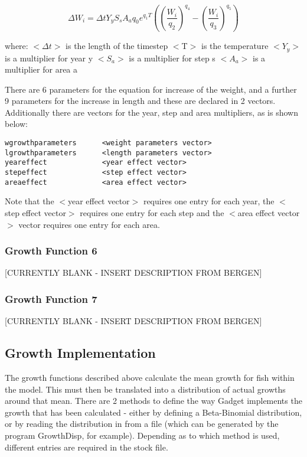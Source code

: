 \documentclass [a4paper, 10pt]{book}
\begin{document}
\begin{equation}\label{eq:growth5w}
\Delta W_i = \Delta t Y_y S_s A_a q_0 e^{q_1T}\left( 
\left( \frac{W_i}{q_2} \right)^{q_4} -
\left( \frac{W_i}{q_3} \right)^{q_5} \right)
\end{equation}

where:\newline
$<$$\Delta t$$>$ is the length of the timestep\newline
$<$T$>$ is the temperature\newline
$<$$Y_y$$>$ is a multiplier for year y\newline 
$<$$S_a$$>$ is a multiplier for step s\newline 
$<$$A_a$$>$ is a multiplier for area a 

\bigskip
There are 6 parameters for the equation for increase of the weight, and a further 9 parameters for the increase in length and these are declared in 2 vectors.  Additionally there are vectors for the year, step and area multipliers, as is shown below:

\begin{verbatim}
wgrowthparameters      <weight parameters vector>
lgrowthparameters      <length parameters vector>
yeareffect             <year effect vector>
stepeffect             <step effect vector>
areaeffect             <area effect vector>
\end{verbatim}

Note that the $<$year effect vector$>$ requires one entry for each year, the $<$step effect vector$>$ requires one entry for each step and the $<$area effect vector$>$ vector requires one entry for each area.

\subsubsection{Growth Function 6}\label{subsec:growth6}
[CURRENTLY BLANK - INSERT DESCRIPTION FROM BERGEN]

\subsubsection{Growth Function 7}\label{subsec:growth7}
[CURRENTLY BLANK - INSERT DESCRIPTION FROM BERGEN]

\subsection{Growth Implementation}\label{subsec:stockgrowthimplement}
The growth functions described above calculate the mean growth for fish within the model. This must then be translated into a distribution of actual growths around that mean.  There are 2 methods to define the way Gadget implements the growth that has been calculated - either by defining a Beta-Binomial distribution, or by reading the distribution in from a file (which can be generated by the program GrowthDisp, for example).  Depending as to which method is used, different entries are required in the stock file.
\end{document}

